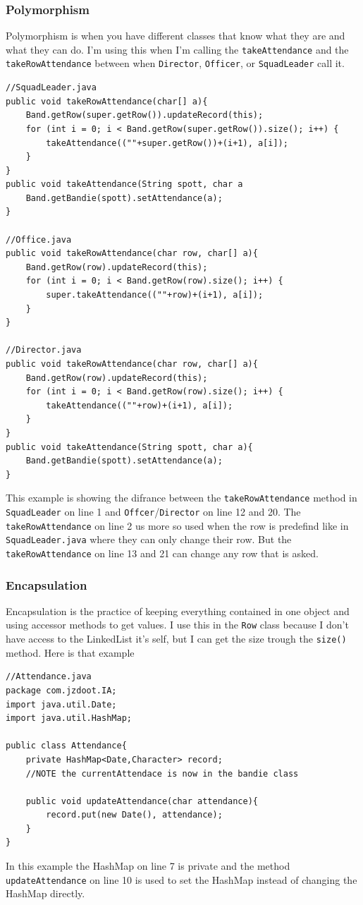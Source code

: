 \documentclass{article}
\begin{document}
\subsubsection{Polymorphism}
Polymorphism is when you have different classes that know what they are and what they can do. I'm using this when I'm calling the \verb|takeAttendance| and the \verb|takeRowAttendance| between when \verb|Director|, \verb|Officer|, or \verb|SquadLeader| call it.
\begin{lstlisting}
//SquadLeader.java
public void takeRowAttendance(char[] a){
	Band.getRow(super.getRow()).updateRecord(this);
	for (int i = 0; i < Band.getRow(super.getRow()).size(); i++) {
		takeAttendance((""+super.getRow())+(i+1), a[i]);
	}
}
public void takeAttendance(String spott, char a
	Band.getBandie(spott).setAttendance(a);
}

//Office.java
public void takeRowAttendance(char row, char[] a){
	Band.getRow(row).updateRecord(this);
	for (int i = 0; i < Band.getRow(row).size(); i++) {
		super.takeAttendance((""+row)+(i+1), a[i]);
	}
}

//Director.java
public void takeRowAttendance(char row, char[] a){
	Band.getRow(row).updateRecord(this);
	for (int i = 0; i < Band.getRow(row).size(); i++) {
		takeAttendance((""+row)+(i+1), a[i]);
	}
}
public void takeAttendance(String spott, char a){
	Band.getBandie(spott).setAttendance(a);
}
\end{lstlisting}
This example is showing the difrance between the \verb|takeRowAttendance| method in \verb|SquadLeader| on line 1 and \verb|Offcer|/\verb|Director| on line 12 and 20. The \verb|takeRowAttendance| on line 2 us more so used when the row is predefind like in \verb|SquadLeader.java| where they can only change their row. But the \verb|takeRowAttendance| on line 13 and 21 can change any row that is asked.
\subsubsection{Encapsulation}
Encapsulation is the practice of keeping everything contained in one object and using accessor methods to get values. I use this in the \verb|Row| class because I don't have access to the LinkedList\cite{linkedList} it's self, but I can get the size trough the \verb|size()| method. Here is that example
\begin{lstlisting}
//Attendance.java
package com.jzdoot.IA;
import java.util.Date;
import java.util.HashMap;

public class Attendance{
	private HashMap<Date,Character> record;
	//NOTE the currentAttendace is now in the bandie class

	public void updateAttendance(char attendance){
		record.put(new Date(), attendance);
	}
}
\end{lstlisting}
In this example the HashMap\cite{hashMap} on line 7 is private and the method \verb|updateAttendance| on line 10 is used to set the HashMap\cite{hashMap} instead of changing the HashMap\cite{hashMap} directly.
\end{document}
